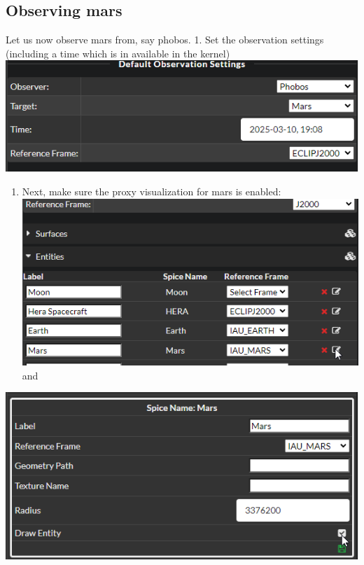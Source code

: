\hypertarget{observing-mars}{%
\subsection{Observing mars}\label{observing-mars}}

Let us now observe mars from, say phobos. 1. Set the observation
settings (including a time which is in available in the kernel)
\includegraphics{images/observe.png}

\begin{enumerate}
\def\labelenumi{\arabic{enumi}.}
\setcounter{enumi}{1}
\tightlist
\item
  Next, make sure the proxy visualization for mars is enabled:
  \includegraphics{./images/MarsProperties.png} and
\end{enumerate}

\includegraphics{./images/visibleMars.png}

